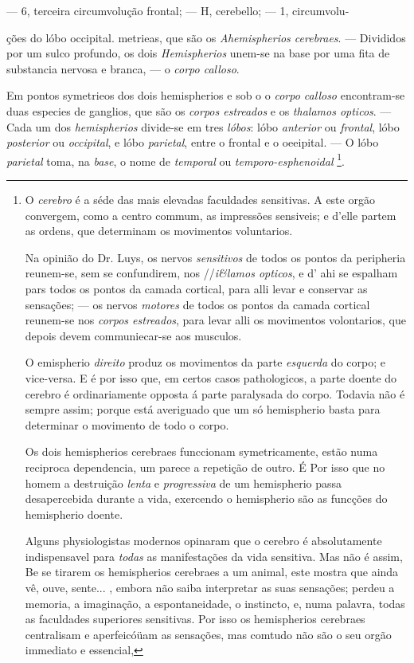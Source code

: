 --- 6, terceira circumvolução frontal; --- H, cerebello; --- 1, circumvolu-

ções do lóbo occipital. metrieas, que são os \emph{Ahemispherios cerebraes}. --- Divididos por um sulco profundo, os dois \emph{Hemispherios} unem-se na base por uma fita de substancia nervosa e branca, --- o \emph{corpo calloso}.

Em pontos symetrieos dos dois hemispherios e sob o o \emph{corpo calloso} encontram-se duas especies de ganglios, que são os \emph{corpos estreados} e os \emph{thalamos opticos}. --- Cada um dos   \emph{hemispherios} divide-se em tres \emph{lóbos}: lóbo \emph{anterior} ou \emph{frontal}, lóbo \emph{posterior} ou \emph{occipital}, e lóbo \emph{parietal}, entre o frontal e o oeeipital. --- O lóbo \emph{parietal} toma, na \emph{base}, o nome de \emph{temporal} ou \emph{temporo-esphenoidal} \footnote{O \emph{cerebro} é a séde das mais elevadas faculdades sensitivas. A este orgão convergem, como a centro commum, as impressões sensiveis; e d'elle partem as ordens, que determinam os movimentos voluntarios.\par Na opinião do Dr. Luys, os nervos \emph{sensitivos} de todos os pontos da peripheria reunem-se, sem se confundirem, nos //\emph{i\&lamos opticos}, e d' ahi se espalham pars todos os pontos da camada cortical, para alli levar e conservar as sensações; --- os nervos \emph{motores} de todos os pontos da camada cortical reunem-se nos \emph{corpos estreados}, para levar alli os movimentos volontarios, que depois devem communiecar-se aos musculos.\par O emispherio \emph{direito} produz os movimentos da parte \emph{esquerda} do corpo; e vice-versa. E é por isso que, em certos casos pathologicos, a parte doente do cerebro é ordinariamente opposta á parte paralysada do corpo. Todavia não é sempre assim; porque está averiguado que um só hemispherio basta para determinar o movimento de todo o corpo.\par Os dois hemispherios cerebraes funccionam symetricamente, estão numa reciproca dependencia, um parece a repetição de outro. É Por isso que no homem a destruição \emph{lenta} e \emph{progressiva} de um hemispherio passa desapercebida durante a vida, exercendo o hemispherio são as funcções do hemispherio doente.\par Alguns physiologistas modernos opinaram que o cerebro é absolutamente indispensavel para \emph{todas} as manifestações da vida sensitiva. Mas não é assim, Be se tirarem os hemispherios cerebraes a um animal, este mostra que ainda vê, ouve, sente... , embora não saiba interpretar as suas sensações; perdeu a memoria, a imaginação, a espontaneidade, o instincto, e, numa palavra, todas as faculdades superiores sensitivas. Por isso os hemispherios cerebraes centralisam e aperfeicóüam as sensações, mas comtudo não são o seu orgão immediato e essencial,}.

